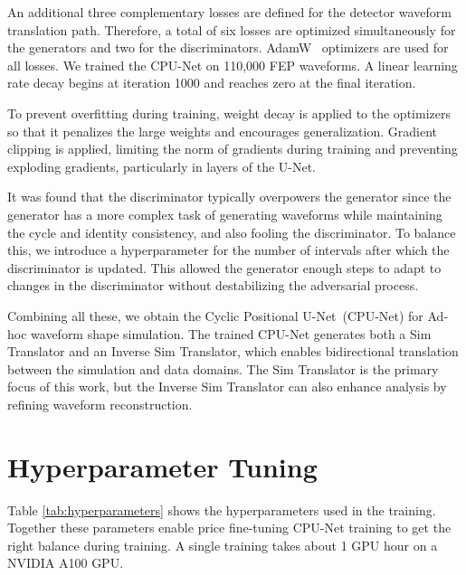 An additional three complementary losses are defined for the detector waveform translation path. Therefore, a total of six losses are optimized simultaneously for the generators and two for the discriminators. AdamW~\cite{adam_w_paper} optimizers are used for all losses. We trained the CPU-Net on 110,000 FEP waveforms. A linear learning rate decay begins at iteration 1000 and reaches zero at the final iteration.

To prevent overfitting during training, weight decay is applied to the optimizers so that it penalizes the large weights and encourages generalization. Gradient clipping is applied, limiting the norm of gradients during training and preventing exploding gradients, particularly in layers of the U-Net.

It was found that the discriminator typically overpowers the generator since the generator has a more complex task of generating waveforms while maintaining the cycle and identity consistency, and also fooling the discriminator. To balance this, we introduce a hyperparameter for the number of intervals after which the discriminator is updated. This allowed the generator enough steps to adapt to changes in the discriminator without destabilizing the adversarial process.

Combining all these, we obtain the Cyclic Positional U-Net~(CPU-Net) for Ad-hoc waveform shape simulation. The trained CPU-Net generates both a Sim Translator and an Inverse Sim Translator, which enables bidirectional translation between the simulation and data domains. The Sim Translator is the primary focus of this work, but the Inverse Sim Translator can also enhance analysis by refining waveform reconstruction. 

\section{Hyperparameter Tuning}



Table \ref{tab:hyperparameters} shows the hyperparameters used in the training. Together these parameters enable price fine-tuning CPU-Net training to get the right balance during training. A single training takes about 1 GPU hour on a NVIDIA A100 GPU.